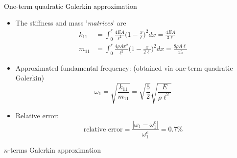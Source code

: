 \documentclass[aspectratio=169]{beamer}
\begin{document}
\begin{frame}{One-term quadratic Galerkin approximation}
  \begin{itemize}
    \item The stiffness and mass '\emph{matrices}' are
          \begin{align*}
            k_{11} & =\int_{0}^{\ell}\frac{4EA}{\ell^{2}}\Big(1-\frac{x}{\ell}\Big)^{2}dx=\frac{4EA}{3\ell}                  \\
            m_{11} & =\int_{0}^{\ell}\frac{4\rho A x^{2}}{\ell^{2}} \Big(1-\frac{x}{2\ell}\Big)^{2}dx=\frac{8\rho A\ell}{15}
          \end{align*}
    \item Approximated fundamental frequency: (obtained via one-term quadratic Galerkin)
          $$\omega_{1}=\sqrt{\frac{k_{11}}{m_{11}}}=\sqrt{\frac{5}{2}}\sqrt{\frac{E}{\rho \ell^{2}}}$$
    \item Relative error:
          $$\mbox{relative error}=\frac{|\omega_{1}-\omega_{1}^{e}|}{\omega_{1}^{e}}=0.7\%$$

  \end{itemize}
\end{frame}

\begin{frame}{$n$-terms Galerkin approximation}
  \begin{center}
    \href{https://drive.mathworks.com/sharing/6a9792ef-d0a7-4aca-a1d0-8b1862b0ac3b}{}
  \end{center}
\end{frame}
\end{document}
